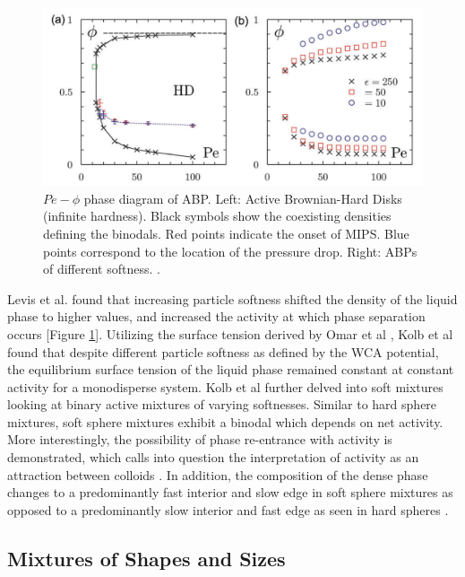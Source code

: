 \documentclass[11pt]{article}
\begin{document}
\begin{figure}[ht]
\centering\includegraphics[width=1.0\linewidth]{Screen Shot 2020-08-11 at 10.06.26 PM.png}
\caption{$Pe-\phi$ phase diagram of ABP. Left: Active Brownian-Hard Disks (infinite hardness). Black symbols show the coexisting densities defining the binodals. Red points indicate the onset of MIPS. Blue points correspond to the location of the pressure drop. Right: ABPs of different softness.  \cite{Levis}.}
\label{fig:softness}
\end{figure}

Levis et al. \cite{Levis} found that increasing particle softness shifted the density of the liquid phase to higher values, and increased the activity at which phase separation occurs [Figure \ref{fig:softness}].  Utilizing the surface tension derived by Omar et al \cite{Omar3}, Kolb et al \cite{Kolb2} found that despite different particle softness as defined by the WCA potential, the equilibrium surface tension of the liquid phase remained constant at constant activity for a monodisperse system. Kolb et al \cite{Kolb} further delved into soft mixtures looking at binary active mixtures of varying softnesses.  Similar to hard sphere mixtures, soft sphere mixtures exhibit a binodal which depends on net activity.  More interestingly, the possibility of phase re-entrance with activity is demonstrated, which calls into question the interpretation of activity as an attraction between colloids \cite{Redner2}. In addition, the composition of the dense phase changes to a predominantly fast interior and slow edge in soft sphere mixtures \cite{Kolb2} as opposed to a predominantly slow interior and fast edge as seen in hard spheres \cite{Kolb}.





\subsection{Mixtures of Shapes and Sizes}\label{shapessizes}
\end{document}
